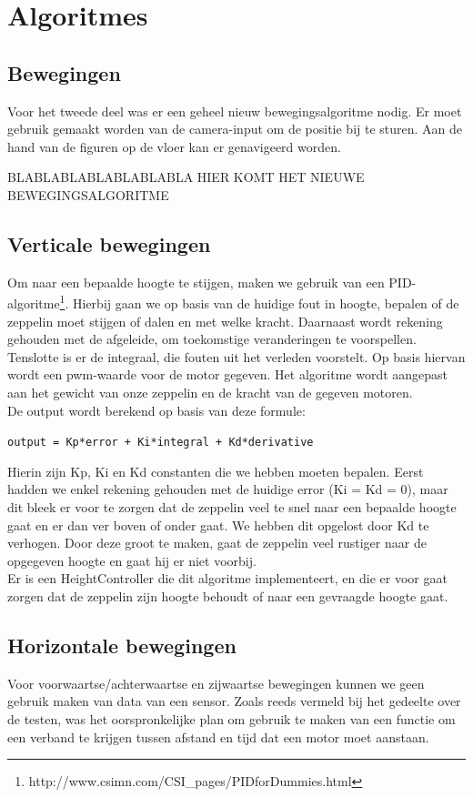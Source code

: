 \documentclass[eind]{penoverslag}
\begin{document}
\section{Algoritmes}
\subsection{Bewegingen}
Voor het tweede deel was er een geheel nieuw bewegingsalgoritme nodig. Er moet gebruik gemaakt worden van de camera-input om de positie bij te sturen. Aan de hand van de figuren op de vloer kan er genavigeerd worden. 

BLABLABLABLABLABLABLA HIER KOMT HET NIEUWE BEWEGINGSALGORITME
\subsection{Verticale bewegingen}
Om naar een bepaalde hoogte te stijgen, maken we gebruik van een PID-algoritme\footnote{http://www.csimn.com/CSI\_pages/PIDforDummies.html}. Hierbij gaan we op basis van de huidige fout in hoogte, bepalen of de zeppelin moet stijgen of dalen en met welke kracht. Daarnaast wordt rekening gehouden met de afgeleide, om toekomstige veranderingen te voorspellen. Tenslotte is er de integraal, die fouten uit het verleden voorstelt. Op basis hiervan wordt een pwm-waarde voor de motor gegeven. Het algoritme wordt aangepast aan het gewicht van onze zeppelin en de kracht van de gegeven motoren. \\
De output wordt berekend op basis van deze formule:

\begin{center}
\texttt{output = Kp*error + Ki*integral + Kd*derivative}\\
\end{center}

Hierin zijn Kp, Ki en Kd constanten die we hebben moeten bepalen. Eerst hadden we enkel rekening gehouden met de huidige error (Ki = Kd = 0), maar dit bleek er voor te zorgen dat de zeppelin veel te snel naar een bepaalde hoogte gaat en er dan ver boven of onder gaat. We hebben dit opgelost door Kd te verhogen. Door deze groot te maken, gaat de zeppelin veel rustiger naar de opgegeven hoogte en gaat hij er niet voorbij. \\

Er is een HeightController die dit algoritme implementeert, en die er voor gaat zorgen dat de zeppelin zijn hoogte behoudt of naar een gevraagde hoogte gaat.

\subsection{Horizontale bewegingen}
Voor voorwaartse/achterwaartse en zijwaartse bewegingen kunnen we geen gebruik maken van data van een sensor. Zoals reeds vermeld bij het gedeelte over de testen, was het oorspronkelijke plan om gebruik te maken van een functie om een verband te krijgen tussen afstand en tijd dat een motor moet aanstaan. \\
\end{document}
